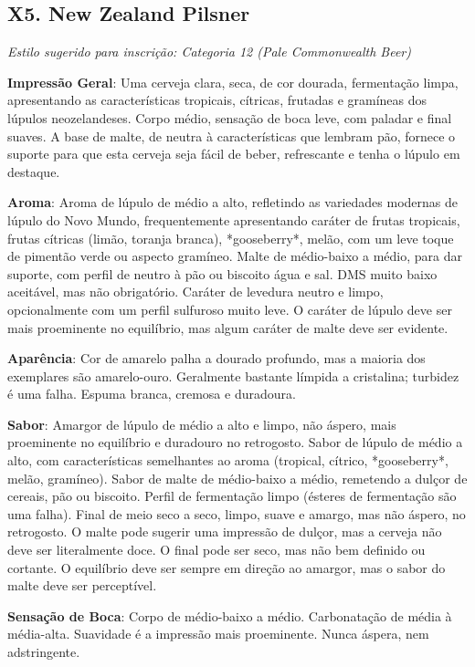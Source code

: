 \subsection*{X5. New Zealand Pilsner}

\textit{Estilo sugerido para inscrição: Categoria 12 (Pale Commonwealth Beer)}

\textbf{Impressão Geral}: Uma cerveja clara, seca, de cor dourada, fermentação limpa, apresentando as características tropicais, cítricas, frutadas e gramíneas dos lúpulos neozelandeses. Corpo médio, sensação de boca leve, com paladar e final suaves. A base de malte, de neutra à características que lembram pão, fornece o suporte para que esta cerveja seja fácil de beber, refrescante e tenha o lúpulo em destaque.

\textbf{Aroma}: Aroma de lúpulo de médio a alto, refletindo as variedades modernas de lúpulo do Novo Mundo, frequentemente apresentando caráter de frutas tropicais, frutas cítricas (limão, toranja branca), *gooseberry*, melão, com um leve toque de pimentão verde ou aspecto gramíneo. Malte de médio-baixo a médio, para dar suporte, com perfil de neutro à pão ou biscoito água e sal. DMS muito baixo aceitável, mas não obrigatório. Caráter de levedura neutro e limpo, opcionalmente com um perfil sulfuroso muito leve. O caráter de lúpulo deve ser mais proeminente no equilíbrio, mas algum caráter de malte deve ser evidente.

\textbf{Aparência}: Cor de amarelo palha a dourado profundo, mas a maioria dos exemplares são amarelo-ouro. Geralmente bastante límpida a cristalina; turbidez é uma falha. Espuma branca, cremosa e duradoura.

\textbf{Sabor}: Amargor de lúpulo de médio a alto e limpo, não áspero, mais proeminente no equilíbrio e duradouro no retrogosto. Sabor de lúpulo de médio a alto, com características semelhantes ao aroma (tropical, cítrico, *gooseberry*, melão, gramíneo). Sabor de malte de médio-baixo a médio, remetendo a dulçor de cereais, pão ou biscoito. Perfil de fermentação limpo (ésteres de fermentação são uma falha). Final de meio seco a seco, limpo, suave e amargo, mas não áspero, no retrogosto. O malte pode sugerir uma impressão de dulçor, mas a cerveja não deve ser literalmente doce. O final pode ser seco, mas não bem definido ou cortante. O equilíbrio deve ser sempre em direção ao amargor, mas o sabor do malte deve ser perceptível.

\textbf{Sensação de Boca}: Corpo de médio-baixo a médio. Carbonatação de média à média-alta. Suavidade é a impressão mais proeminente. Nunca áspera, nem adstringente.

